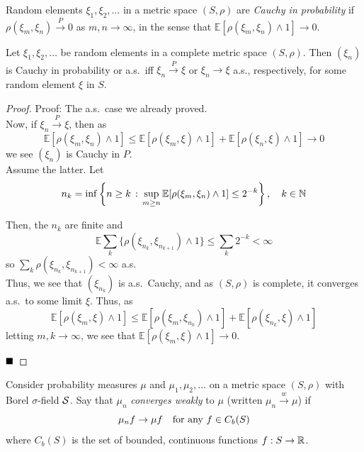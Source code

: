 
\begin{definition}
    Random elements $\xi_1, \xi_2, \ldots$ in a metric space $(S, \rho)$ are \emph{Cauchy in probability} if $\rho(\xi_m, \xi_n) \xrightarrow{P} 0$ as $m, n \to \infty$, in the sense that $\mathbb{E}[\rho(\xi_m, \xi_n) \wedge 1] \to 0$.
\end{definition}

\begin{lemma}
    Let $\xi_1, \xi_2, \ldots$ be random elements in a complete metric space $(S, \rho)$. Then $(\xi_n)$ is Cauchy in probability or a.s.\ iff $\xi_n \xrightarrow{P} \xi$ or $\xi_n \to \xi$ a.s., respectively, for some random element $\xi$ in $S$.
\end{lemma}
\begin{proof}{Proof:}
    The a.s.\ case we already proved.\\

    Now, if $\xi_n \xrightarrow{P} \xi$, then as
    \[ \mathbb{E}[\rho(\xi_m, \xi_n) \wedge 1] \leq \mathbb{E}[\rho(\xi_m, \xi) \wedge 1] + \mathbb{E}[\rho(\xi_n, \xi) \wedge 1] \to 0 \]
    we see $(\xi_n)$ is Cauchy in $P$.\\

    Assume the latter. Let
    \[ n_k = \inf\left\{n \geq k \col \sup_{m \geq n} \mathbb{E}[\rho(\xi_m, \xi_n) \wedge 1] \leq 2^{-k}\right\}, \quad k \in \N \]

    Then, the $n_k$ are finite and
    \[ \mathbb{E}\sum_{k}\{\rho(\xi_{n_k}, \xi_{n_{k + 1}}) \wedge 1\} \leq \sum_{k} 2^{-k} < \infty \]
    so $\sum_{k} \rho(\xi_{n_k}, \xi_{n_{k + 1}}) < \infty$ a.s.\\

    Thus, we see that $(\xi_{n_k})$ is a.s.\ Cauchy, and as $(S, \rho)$ is complete, it converges a.s.\ to some limit $\xi$. Thus, as
    \[ \mathbb{E}[\rho(\xi_m, \xi) \wedge 1] \leq \mathbb{E}[\rho(\xi_m, \xi_{n_k}) \wedge 1] + \mathbb{E}[\rho(\xi_{n_k}, \xi) \wedge 1] \]
    letting $m, k \to \infty$, we see that $\mathbb{E}[\rho(\xi_m, \xi) \wedge 1] \to 0$.

    $\qed$
\end{proof}

\begin{definition}
    Consider probability measures $\mu$ and $\mu_1, \mu_2, \ldots$ on a metric space $(S, \rho)$ with Borel $\sigma$-field $\cal{S}$. Say that $\mu_n$ \emph{converges weakly} to $\mu$ (written $\mu_n \xrightarrow{w} \mu$) if
    \[ \mu_n f \to \mu f \quad \tt{for any } f \in C_b(S) \]
    where $C_b(S)$ is the set of bounded, continuous functions $f : S \to \R$.
\end{definition}

